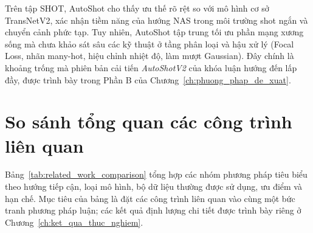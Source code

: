 Trên tập SHOT, AutoShot cho thấy ưu thế rõ rệt so với mô hình cơ sở TransNetV2, xác nhận tiềm năng của hướng NAS trong môi trường shot ngắn và chuyển cảnh phức tạp. Tuy nhiên, AutoShot tập trung tối ưu phần mạng xương sống mà chưa khảo sát sâu các kỹ thuật ở tầng phân loại và hậu xử lý (Focal Loss, nhãn many-hot, hiệu chỉnh nhiệt độ, làm mượt Gaussian). Đây chính là khoảng trống mà phiên bản cải tiến \textit{AutoShotV2} của khóa luận hướng đến lấp đầy, được trình bày trong Phần B của Chương~\ref{ch:phuong_phap_de_xuat}.

\section{So sánh tổng quan các công trình liên quan}
\label{sec:method_comparison_table}
Bảng~\ref{tab:related_work_comparison} tổng hợp các nhóm phương pháp tiêu biểu theo hướng tiếp cận, loại mô hình, bộ dữ liệu thường được sử dụng, ưu điểm và hạn chế. Mục tiêu của bảng là đặt các công trình liên quan vào cùng một bức tranh phương pháp luận; các kết quả định lượng chi tiết được trình bày riêng ở Chương~\ref{ch:ket_qua_thuc_nghiem}.

